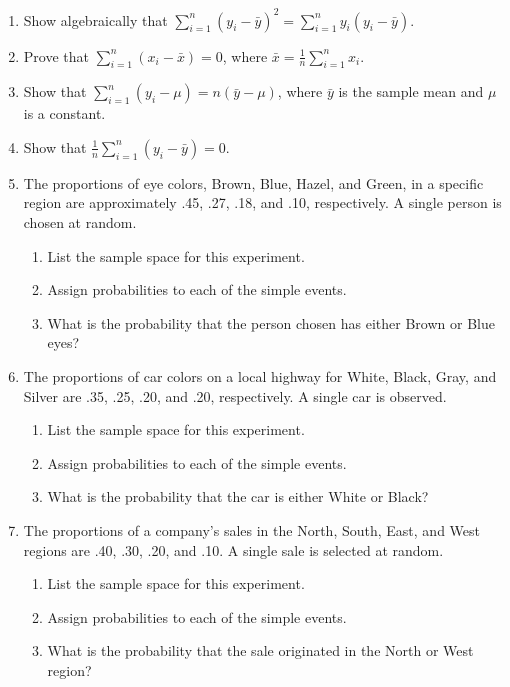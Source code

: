 \documentclass[11pt]{article}
\begin{document}
\begin{enumerate}
\item Show algebraically that $\sum_{i=1}^{n} (y_i - \bar{y})^2 = \sum_{i=1}^{n} y_i(y_i - \bar{y})$. 

\item Prove that $\sum_{i=1}^{n} (x_i - \bar{x}) = 0$, where $\bar{x} = \frac{1}{n}\sum_{i=1}^{n} x_i$.

\item Show that $\sum_{i=1}^{n} (y_i - \mu) = n(\bar{y} - \mu)$, where $\bar{y}$ is the sample mean and $\mu$ is a constant.

\item Show that $\frac{1}{n}\sum_{i=1}^{n} (y_i - \bar{y}) = 0$.

\item The proportions of eye colors, Brown, Blue, Hazel, and Green, in a specific region are approximately .45, .27, .18, and .10, respectively. A single person is chosen at random.
\begin{enumerate}
    \item List the sample space for this experiment.
    \item Assign probabilities to each of the simple events.
    \item What is the probability that the person chosen has either Brown or Blue eyes?
\end{enumerate}

\item The proportions of car colors on a local highway for White, Black, Gray, and Silver are .35, .25, .20, and .20, respectively. A single car is observed.
\begin{enumerate}
    \item List the sample space for this experiment.
    \item Assign probabilities to each of the simple events.
    \item What is the probability that the car is either White or Black?
\end{enumerate}

\item The proportions of a company's sales in the North, South, East, and West regions are .40, .30, .20, and .10. A single sale is selected at random.
\begin{enumerate}
    \item List the sample space for this experiment.
    \item Assign probabilities to each of the simple events.
    \item What is the probability that the sale originated in the North or West region?
\end{enumerate}


\end{enumerate}
\end{document}

